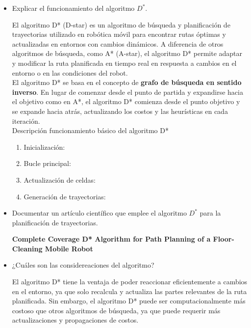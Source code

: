 \documentclass{article}
\begin{document}
\begin{itemize}
\item Explicar el funcionamiento del algoritmo $D^{*}$.

  El algoritmo D* (D-star) es un algoritmo de búsqueda y planificación de trayectorias utilizado en robótica móvil para encontrar rutas óptimas y actualizadas en entornos con cambios dinámicos. A diferencia de otros algoritmos de búsqueda, como A* (A-star), el algoritmo D* permite adaptar y modificar la ruta planificada en tiempo real en respuesta a cambios en el entorno o en las condiciones del robot.\\

  El algoritmo D* se basa en el concepto de \textbf{grafo de búsqueda en sentido inverso}. En lugar de comenzar desde el punto de partida y expandirse hacia el objetivo como en A*, el algoritmo D* comienza desde el punto objetivo y se expande hacia atrás, actualizando los costos y las heurísticas en cada iteración.\\

  Descripción funcionamiento básico del algoritmo D*

  \begin{enumerate}
  \item Inicialización:
  \item Bucle principal:
  \item Actualización de celdas:
  \item Generación de trayectorias:
  \end{enumerate}
  
\item Documentar un artículo científico que emplee el algoritmo $D^{*}$ para la planificación de trayectorias.

  \textbf{Complete Coverage D* Algorithm for Path Planning of a Floor-Cleaning Mobile Robot} 
  
\item ¿Cuáles son las considereaciones del algoritmo?
  
  El algoritmo D* tiene la ventaja de poder reaccionar eficientemente a cambios en el entorno, ya que solo recalcula y actualiza las partes relevantes de la ruta planificada. Sin embargo, el algoritmo D* puede ser computacionalmente más costoso que otros algoritmos de búsqueda, ya que puede requerir más actualizaciones y propagaciones de costos.


\end{itemize}
\end{document}
